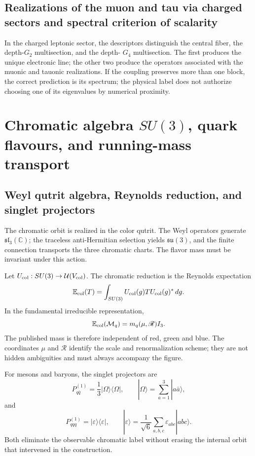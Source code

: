\subsection{Realizations of the muon and tau via charged sectors and spectral criterion of scalarity}

In the charged leptonic sector, the descriptors distinguish the central fiber,
the depth-\(G_2\) multisection, and the depth-
\(G_4\) multisection. The first produces the unique electronic line; the other two
produce the operators associated with the muonic and tauonic realizations. If
the coupling preserves more than one block, the correct prediction is its
spectrum; the physical label does not authorize choosing one of its eigenvalues by
numerical proximity.

\section{Chromatic algebra \texorpdfstring{\(SU(3)\)}{SU(3)}, quark flavours, and running-mass transport}

\subsection{Weyl qutrit algebra, Reynolds reduction, and singlet projectors}

The chromatic orbit is realized in the color qutrit. The Weyl operators
generate \(\mathfrak{sl}_3(\mathbb C)\); the traceless anti-Hermitian selection
yields \(\mathfrak{su}(3)\), and the finite connection transports the three
chromatic charts. The flavor mass must be invariant under this action.

Let \(U_{\rm col}:SU(3)\to\mathcal U(V_{\rm col})\). The chromatic reduction
is the Reynolds expectation
\[
 \mathbb E_{\rm col}(T)
 =\int_{SU(3)}U_{\rm col}(g)T U_{\rm col}(g)^*\,dg.
\]
In the fundamental irreducible representation,
\[
 \mathbb E_{\rm col}(\mathcal M_q)
 =m_q(\mu,\mathscr R)I_3.
\]
The published mass is therefore independent of red, green and blue. The
coordinates \(\mu\) and \(\mathscr R\) identify the scale and renormalization
scheme; they are not hidden ambiguities and must always accompany the
figure.

For mesons and baryons, the singlet projectors are
\[
 P_{q\bar q}^{(1)}
 =\frac1{3}|\Omega\rangle\langle\Omega|,
 \qquad
 |\Omega\rangle=\sum_{a=1}^{3}|a\bar a\rangle,
\]
and
\[
 P_{qqq}^{(1)}
 =|\varepsilon\rangle\langle\varepsilon|,
 \qquad
 |\varepsilon\rangle
 =\frac1{\sqrt6}\sum_{a,b,c}\varepsilon_{abc}|abc\rangle.
\]
Both eliminate the observable chromatic label without erasing the internal orbit
that intervened in the construction.

